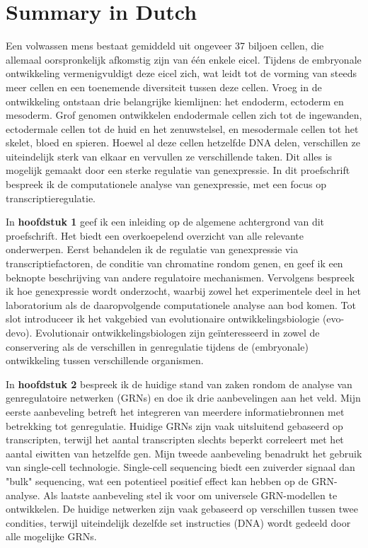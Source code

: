 \section{Summary in Dutch}

Een volwassen mens bestaat gemiddeld uit ongeveer 37 biljoen cellen, die allemaal oorspronkelijk afkomstig zijn van \'e\'en enkele eicel. Tijdens de embryonale ontwikkeling vermenigvuldigt deze eicel zich, wat leidt tot de vorming van steeds meer cellen en een toenemende diversiteit tussen deze cellen. Vroeg in de ontwikkeling ontstaan drie belangrijke kiemlijnen: het endoderm, ectoderm en mesoderm. Grof genomen ontwikkelen endodermale cellen zich tot de ingewanden, ectodermale cellen tot de huid en het zenuwstelsel, en mesodermale cellen tot het skelet, bloed en spieren. Hoewel al deze cellen hetzelfde DNA delen, verschillen ze uiteindelijk sterk van elkaar en vervullen ze verschillende taken. Dit alles is mogelijk gemaakt door een sterke regulatie van genexpressie. In dit proefschrift bespreek ik de computationele analyse van genexpressie, met een focus op transcriptieregulatie.

In \textbf{hoofdstuk 1} geef ik een inleiding op de algemene achtergrond van dit proefschrift. Het biedt een overkoepelend overzicht van alle relevante onderwerpen. Eerst behandelen ik de regulatie van genexpressie via transcriptiefactoren, de conditie van chromatine rondom genen, en geef ik een beknopte beschrijving van andere regulatoire mechanismen. Vervolgens bespreek ik hoe genexpressie wordt onderzocht, waarbij zowel het experimentele deel in het laboratorium als de daaropvolgende computationele analyse aan bod komen. Tot slot introduceer ik het vakgebied van evolutionaire ontwikkelingsbiologie (evo-devo). Evolutionair ontwikkelingsbiologen zijn geïnteresseerd in zowel de conservering als de verschillen in genregulatie tijdens de (embryonale) ontwikkeling tussen verschillende organismen.

In \textbf{hoofdstuk 2} bespreek ik de huidige stand van zaken rondom de analyse van genregulatoire netwerken (GRNs) en doe ik drie aanbevelingen aan het veld. Mijn eerste aanbeveling betreft het integreren van meerdere informatiebronnen met betrekking tot genregulatie. Huidige GRNs zijn vaak uitsluitend gebaseerd op transcripten, terwijl het aantal transcripten slechts beperkt correleert met het aantal eiwitten van hetzelfde gen. Mijn tweede aanbeveling benadrukt het gebruik van single-cell technologie. Single-cell sequencing biedt een zuiverder signaal dan "bulk" sequencing, wat een potentieel positief effect kan hebben op de GRN-analyse. Als laatste aanbeveling stel ik voor om universele GRN-modellen te ontwikkelen. De huidige netwerken zijn vaak gebaseerd op verschillen tussen twee condities, terwijl uiteindelijk dezelfde set instructies (DNA) wordt gedeeld door alle mogelijke GRNs.

